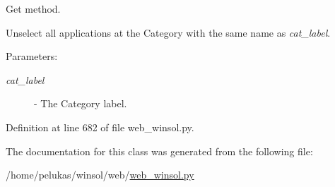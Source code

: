Get method. 

Unselect all applications at the Category with the same name as {\em cat\_\-label\/}.

\begin{Desc}
\item[Parameters:]
\begin{description}
\item[{\em cat\_\-label}]- The Category label. \end{description}
\end{Desc}


Definition at line 682 of file web\_\-winsol.py.

The documentation for this class was generated from the following file:\begin{CompactItemize}
\item 
/home/pelukas/winsol/web/\hyperlink{web__winsol_8py}{web\_\-winsol.py}\end{CompactItemize}
